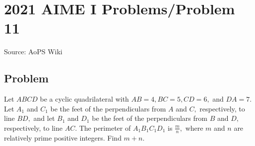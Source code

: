 \documentclass[12pt]{article}
\begin{document}
\section*{{2021 AIME I Problems/Problem 11}}
Source: AoPS Wiki

\subsection*{Problem}
Let $ABCD$ be a cyclic quadrilateral with $AB=4,BC=5,CD=6,$ and $DA=7.$ Let $A_1$ and $C_1$ be the feet of the perpendiculars from $A$ and $C,$ respectively, to line $BD,$ and let $B_1$ and $D_1$ be the feet of the perpendiculars from $B$ and $D,$ respectively, to line $AC.$ The perimeter of $A_1B_1C_1D_1$ is $\frac mn,$ where $m$ and $n$ are relatively prime positive integers. Find $m+n.$
\end{document}
